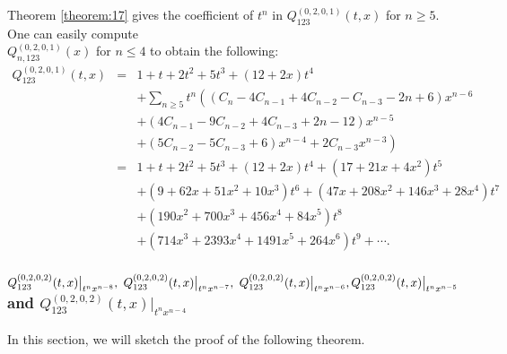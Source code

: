 \documentclass[
final,nomarks
]{dmtcs-episciences}
\newcommand{\tref}[1]{Theorem \ref{theorem:#1}}
\newcommand{\Qm}[1]{Q_{123}^{(#1)}(t,x)}
\newcommand{\Qmn}[2]{Q_{#2,123}^{(#1)}(x)}
\begin{document}
\tref{17} gives the coefficient of \begin{math}t^n\end{math} in \begin{math}\Qm{0,2,0,1}\end{math} for \begin{math}n\geq 5\end{math}. One can easily 
compute \\\begin{math}\Qmn{0,2,0,1}{n}\end{math} for \begin{math}n \leq 4\end{math} to obtain the following:
\begin{eqnarray}
	\Qm{0,2,0,1}&=&1+t+2t^2+5t^3+(12+2x)t^4\nonumber\\\nonumber
	&&+\sum_{n\geq 5}t^n\left(
	(C_n-4C_{n-1}+4C_{n-2}-C_{n-3}-2n+6)x^{n-6}\right.\\\nonumber
	&&+(4C_{n-1}-9C_{n-2}+4C_{n-3}+2n-12)x^{n-5}\\\nonumber
	&&\left.+(5C_{n-2}-5C_{n-3}+6)x^{n-4}+2C_{n-3} x^{n-3}
	\right)\\\nonumber
	&=&1+t+2 t^2+5 t^3+(12+2 x) t^4+\left(17+21 x+4 x^2\right) t^5\\\nonumber
	&&+\left(9+62 x+51
	x^2+10 x^3\right) t^6+\left(47 x+208 x^2+146 x^3+28 x^4\right) t^7\\\nonumber
	&&+\left(190
	x^2+700 x^3+456 x^4+84 x^5\right) t^8\\
	&&+\left(714 x^3+2393 x^4+1491 x^5+264
	x^6\right) t^9+\cdots .
\end{eqnarray}  

\subsubsection{\(\Qm{0,2,0,2}\big|_{t^n x^{n-8}},\ \Qm{0,2,0,2}\big|_{t^n x^{n-7}},\ \Qm{0,2,0,2}\big|_{t^n x^{n-6}},\\\Qm{0,2,0,2}\big|_{t^n x^{n-5}}\) and \(\Qm{0,2,0,2}\big|_{t^n x^{n-4}}\)}

In this section, we will sketch the proof of the following theorem. 
\end{document}
